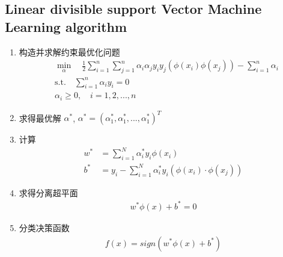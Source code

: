 \documentclass[oneside, 12pt]{ctexbook}
\begin{document}
			\subsection{\quad Linear divisible support Vector Machine Learning algorithm}
				\begin{enumerate}
					\item 构造并求解约束最优化问题
						\begin{align}
							&\min\limits_{\alpha} \quad \frac{1}{2} \sum_{i=1}^{n}\sum_{j=1}^{n} \alpha_i \alpha_j y_i y_j \left( \phi(x_i) \phi(x_j) \right) - \sum_{i=1}^{n} \alpha_i \\
							&\text{s.t.} \quad \sum_{i=1}^{n} \alpha_i y_i =0\\
							&\alpha_i \geq 0, \quad i=1,2,...,n
						\end{align}
						
					\item 求得最优解 $\alpha^*$, $\alpha^* = (\alpha_1^*,\alpha_1^*,...,\alpha_1^* )^T$
					
					\item 计算
						\begin{align}
							w^* &= \sum_{i=1}^{N} \alpha_i^* y_i \phi(x_i)\\
							b^* &= y_i - \sum_{i=1}^{N} \alpha_i^* y_i (\phi(x_i) \cdot \phi(x_j))
						\end{align}
						
					\item 求得分离超平面
						\begin{align}
							w^* \phi(x) + b^* = 0
						\end{align}
						
					\item 分类决策函数
						\begin{align}
							f(x) = sign(w^* \phi(x) + b^*)
						\end{align}
						

\end{enumerate}
\end{document}
